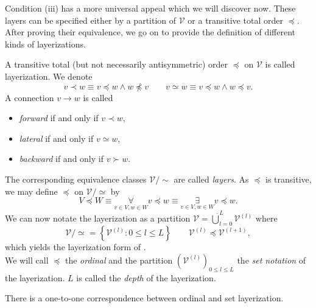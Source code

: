 \documentclass[a4paper,11pt]{report}
\begin{document}
\begin{Par}
Condition (iii) has a more universal appeal which we will discover now. These layers can be specified either by a partition of $\mathcal{V}$ or a transitive total order $\preceq$. After proving their equivalence, we go on to provide the definition of different kinds of layerizations.
\end{Par}

\begin{Def}[Layerization]\label{def:layerization}
A transitive total (but not necessarily antisymmetric) order $\preceq$ on $\mathcal{V}$ is called layerization. We denote
\[
v\prec w\equiv v\preceq w\wedge w\npreceq v\qquad v\simeq w\equiv v\preceq w\wedge w\preceq v.
\]
A connection $v\to w$ is called
\begin{itemize}
\item
\emph{forward} if and only if $v\prec w$,
\item
\emph{lateral} if and only if $v\simeq w$,
\item
\emph{backward} if and only if $v\succ w$.
\end{itemize}
The corresponding equivalence classes $\mathcal{V}/{\sim}$ are called \emph{layers}. As $\preceq$ is transitive, we may define $\preceq$ on $\mathcal{V}/{\simeq}$ by
\begin{equation}
V\preceq W\equiv\underset{v\in V, w\in W}{\forall}v\preceq w\equiv\underset{v\in V,w\in W}{\exists}v\preceq w.
\end{equation}
We can now notate the layerization as a partition $\mathcal{V}=\dot{\bigcup}_{l=0}^L\mathcal{V}^{(l)}$ where
\[
\mathcal{V}/{\simeq}=\left\{\mathcal{V}^{(l)}:0\le l\le L\right\}
\qquad 
\mathcal{V}^{(l)}\preceq\mathcal{V}^{(l+1)},
\]
which yields the layerization form of .\\
We will call $\preceq$ the \emph{ordinal} and the partition $\left(\mathcal{V}^{(l)}\right)_{0\le l\le L}$ the \emph{set notation} of the layerization. $L$ is called the \emph{depth} of the layerization.
\end{Def}

\begin{Pro}\label{pro:layerization-11}
There is a one-to-one correspondence between ordinal and set layerization.
\end{Pro}
\end{document}
